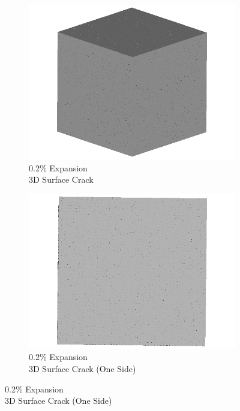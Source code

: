 \begin{figure}[ht!]
\centering
    \begin{subfigure}{.5\textwidth}
      \centering
      \includegraphics[width=0.5\linewidth]{Files/exp_3D/DEF/A30X-1C_1_3d.png}
      \caption{0.2\% Expansion\\3D Surface Crack}
    \end{subfigure}%
    \begin{subfigure}{.5\textwidth}
      \centering
      \includegraphics[width=0.5\linewidth]{Files/exp_3D/DEF/A30X-1C_1_3ds.png}
      \caption{0.2\% Expansion\\3D Surface Crack (One Side)}
    \end{subfigure}%


\end{figure}
